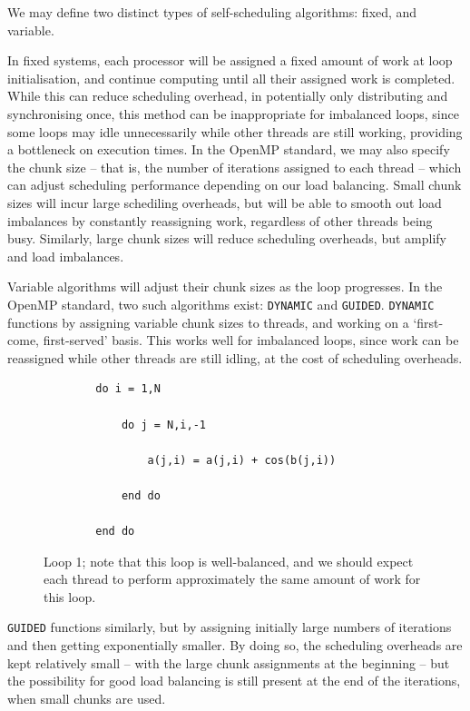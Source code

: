\documentclass{article} %
\newcommand{\tp}{\texttt}
\begin{document}
We may define two distinct types of self-scheduling algorithms: fixed, and variable.

In fixed systems, each processor will be assigned a fixed amount of work at loop initialisation, and continue computing until all their assigned work is completed.
While this can reduce scheduling overhead, in potentially only distributing and synchronising once, this method can be inappropriate for imbalanced loops, since some loops may idle unnecessarily while other threads are still working, providing a bottleneck on execution times.
In the OpenMP standard, we may also specify the chunk size -- that is, the number of iterations assigned to each thread -- which can adjust scheduling performance depending on our load balancing.
Small chunk sizes will incur large schediling overheads, but will be able to smooth out load imbalances by constantly reassigning work, regardless of other threads being busy.
Similarly, large chunk sizes will reduce scheduling overheads, but amplify and load imbalances.

Variable algorithms will adjust their chunk sizes as the loop progresses. 
In the OpenMP standard, two such algorithms exist: \tp{DYNAMIC} and \tp{GUIDED}.
\tp{DYNAMIC} functions by assigning variable chunk sizes to threads, and working on a `first-come, first-served' basis.
This works well for imbalanced loops, since work can be reassigned while other threads are still idling, at the cost of scheduling overheads.

\begin{figure}
    \begin{lstlisting}
        do i = 1,N

            do j = N,i,-1
        
                a(j,i) = a(j,i) + cos(b(j,i))
        
            end do
      
        end do
    \end{lstlisting}
    \caption{Loop 1; note that this loop is well-balanced, and we should expect each thread to perform approximately the same amount of work for this loop.}
    \label{listing:loop1}
\end{figure}

\tp{GUIDED} functions similarly, but by assigning initially large numbers of iterations and then getting exponentially smaller.
By doing so, the scheduling overheads are kept relatively small -- with the large chunk assignments at the beginning -- but the possibility for good load balancing is still present at the end of the iterations, when small chunks are used.
\end{document}
